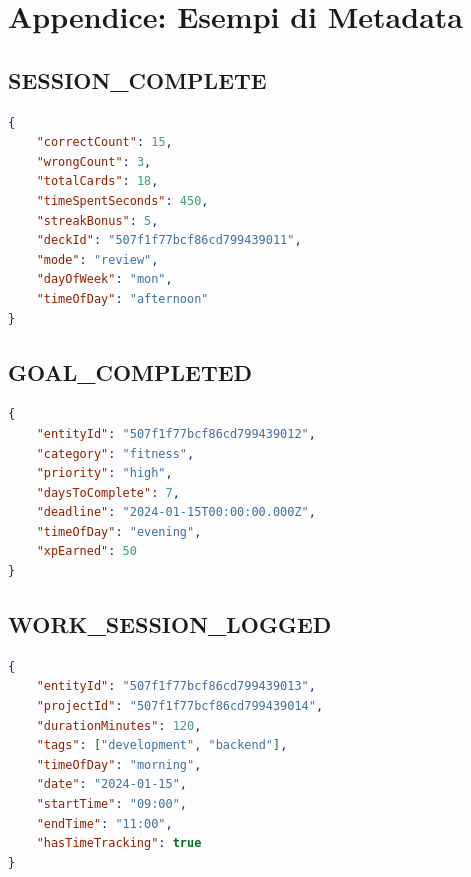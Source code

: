 \documentclass[11pt,a4paper]{article}
\begin{document}
\section{Appendice: Esempi di Metadata}

\subsection{SESSION\_COMPLETE}

\begin{lstlisting}[language=JSON]
{
    "correctCount": 15,
    "wrongCount": 3,
    "totalCards": 18,
    "timeSpentSeconds": 450,
    "streakBonus": 5,
    "deckId": "507f1f77bcf86cd799439011",
    "mode": "review",
    "dayOfWeek": "mon",
    "timeOfDay": "afternoon"
}
\end{lstlisting}

\subsection{GOAL\_COMPLETED}

\begin{lstlisting}[language=JSON]
{
    "entityId": "507f1f77bcf86cd799439012",
    "category": "fitness",
    "priority": "high",
    "daysToComplete": 7,
    "deadline": "2024-01-15T00:00:00.000Z",
    "timeOfDay": "evening",
    "xpEarned": 50
}
\end{lstlisting}

\subsection{WORK\_SESSION\_LOGGED}

\begin{lstlisting}[language=JSON]
{
    "entityId": "507f1f77bcf86cd799439013",
    "projectId": "507f1f77bcf86cd799439014",
    "durationMinutes": 120,
    "tags": ["development", "backend"],
    "timeOfDay": "morning",
    "date": "2024-01-15",
    "startTime": "09:00",
    "endTime": "11:00",
    "hasTimeTracking": true
}
\end{lstlisting}
\end{document}
